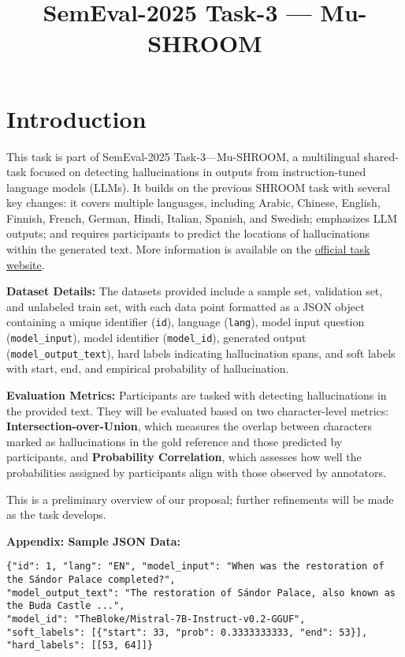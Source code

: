 \documentclass{article}
\title{SemEval-2025 Task-3 — Mu-SHROOM}
\author{}
\date{}
\renewcommand{\normalsize}{\fontsize{10}{12}\selectfont}
\begin{document}
\maketitle

\section{Introduction}

This task is part of SemEval-2025 Task-3—Mu-SHROOM, a multilingual shared-task focused on detecting hallucinations in outputs from instruction-tuned language models (LLMs). It builds on the previous SHROOM task with several key changes: it covers multiple languages, including Arabic, Chinese, English, Finnish, French, German, Hindi, Italian, Spanish, and Swedish; emphasizes LLM outputs; and requires participants to predict the locations of hallucinations within the generated text. More information is available on the \href{https://helsinki-nlp.github.io/shroom/}{official task website}.

\textbf{Dataset Details:} The datasets provided include a sample set, validation set, and unlabeled train set, with each data point formatted as a JSON object containing a unique identifier (\texttt{id}), language (\texttt{lang}), model input question (\texttt{model\_input}), model identifier (\texttt{model\_id}), generated output (\texttt{model\_output\_text}), hard labels indicating hallucination spans, and soft labels with start, end, and empirical probability of hallucination. 


\textbf{Evaluation Metrics:} Participants are tasked with detecting hallucinations in the provided text. They will be evaluated based on two character-level metrics: \textbf{Intersection-over-Union}, which measures the overlap between characters marked as hallucinations in the gold reference and those predicted by participants, and \textbf{Probability Correlation}, which assesses how well the probabilities assigned by participants align with those observed by annotators. 

This is a preliminary overview of our proposal; further refinements will be made as the task develops.

\small
\textbf{Appendix: Sample JSON Data:}
\begin{verbatim}
{"id": 1, "lang": "EN", "model_input": "When was the restoration of the Sándor Palace completed?", 
"model_output_text": "The restoration of Sándor Palace, also known as the Buda Castle ...", 
"model_id": "TheBloke/Mistral-7B-Instruct-v0.2-GGUF", 
"soft_labels": [{"start": 33, "prob": 0.3333333333, "end": 53}], "hard_labels": [[53, 64]]}
\end{verbatim}
\normalsize
\end{document}
